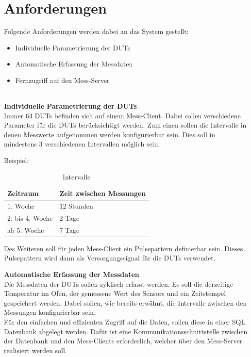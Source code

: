 \section{Anforderungen}

Folgende Anforderungen werden dabei an das System gestellt:
\begin{itemize}
\item Individuelle Parametrierung der \acp{DUT}
\item Automatische Erfassung der Messdaten
\item Fernzugriff auf den Mess-Server
\end{itemize}
\ \\
\textbf{Individuelle Parametrierung der \acp{DUT}}\\
Immer 64 \acp{DUT} befinden sich auf einem Mess-Client. Dabei sollen verschiedene Parameter für die \acp{DUT} berücksichtigt werden. 
Zum einen sollen die Intervalle in denen Messwerte aufgenommen werden konfigurierbar sein. Dies soll in mindestens 3 verschiedenen Intervallen möglich sein.

Beispiel: 

\begin{table}[H]
\begin{center}
\begin{tabular}{|l|l|}\hline
Zeitraum & Zeit zwischen Messungen \\ \hline
1. Woche & 12 Stunden\\ 
2. bis 4. Woche & 2 Tage\\ 

ab 5. Woche & 7 Tage\\ \hline
\end{tabular}
\caption{Intervalle}
\label{table_Intervalle}
\end{center}
\end{table}



Des Weiteren soll für jeden Mess-Client ein Pulsepattern definierbar sein. Dieses Pulsepattern wird dann als Versorgungssignal für die \acp{DUT} verwendet.

\textbf{Automatische Erfassung der Messdaten}\\
Die Messdaten der \acp{DUT} sollen zyklisch erfasst werden. Es soll die derzeitige Temperatur im Ofen, der gemessene Wert des Sensors und ein Zeitstempel gespeichert werden. Dabei sollen, wie bereits erwähnt, die Intervalle zwischen den Messungen konfigurierbar sein.\\
Für den einfachen und effizienten Zugriff auf die Daten, sollen diese in einer \ac{SQL} Datenbank abgelegt werden. Dafür ist eine Kommunikationsschnittstelle zwischen der Datenbank und den Mess-Clients erforderlich, welcher über den Mess-Server realisiert werden soll.

